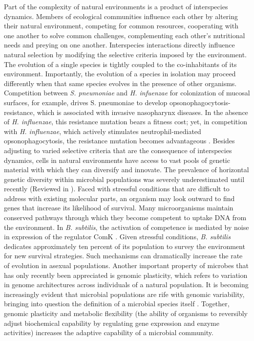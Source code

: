 Part of the complexity of natural environments is a product of interspecies dynamics. Members of ecological communities influence each other by altering their natural environment, competing for common resources, cooperating with one another to solve common challenges, complementing each other’s nutritional needs and preying on one another.  Interspecies interactions directly influence natural selection by modifying the selective criteria imposed by the environment.  The evolution of a single species is tightly coupled to the co-inhabitants of its environment. Importantly, the evolution of a species in isolation may proceed differently when that same species evolves in the presence of other organisms. Competition between \textit{S. pneumoniae} and \textit{H. infuenzae} for colonization of mucosal surfaces, for example, drives S. pneumoniae to develop opsonophagocytosis-resistance, which is associated with invasive nasopharynx diseases. In the absence of \textit{H. influenzae}, this resistance mutation bears a fitness cost; yet, in competition with \textit{H. influenzae}, which actively stimulates neutrophil-mediated opsonophagocytosis, the resistance mutation becomes advantageous \cite{lysenko_within-host_2010}. Besides adjusting to varied selective criteria that are the consequence of interspecies dynamics, cells in natural environments have access to vast pools of genetic material with which they can diversify and innovate. The prevalence of horizontal genetic diversity within microbial populations was severely underestimated until recently (Reviewed in \cite{koonin_horizontal_2001}). Faced with stressful conditions that are difficult to address with existing molecular parts, an organism may look outward to find genes that increase its likelihood of survival.  Many microorganisms maintain conserved pathways through which they become competent to uptake DNA from the environment.  In \textit{B. subtilis}, the activation of competence is mediated by noise in expression of the regulator ComK \cite{schultz_deciding_2009,maamar_noise_2007}. Given stressful conditions, \textit{B. subtilis} dedicates approximately ten percent of its population to survey the environment for new survival strategies. Such mechanisms can dramatically increase the rate of evolution in asexual populations.  Another important property of microbes that has only recently been appreciated is genomic plasticity, which refers to variation in genome architectures across individuals of a natural population.  It is becoming increasingly evident that microbial populations are rife with genomic variability, bringing into question the definition of a microbial species itself \cite{smith_how_1993,achtman_microbial_2008}. Together, genomic plasticity and metabolic flexibility (the ability of organisms to reversibly adjust biochemical capability by regulating gene expression and enzyme activities) increases the adaptive capability of a microbial community.   

